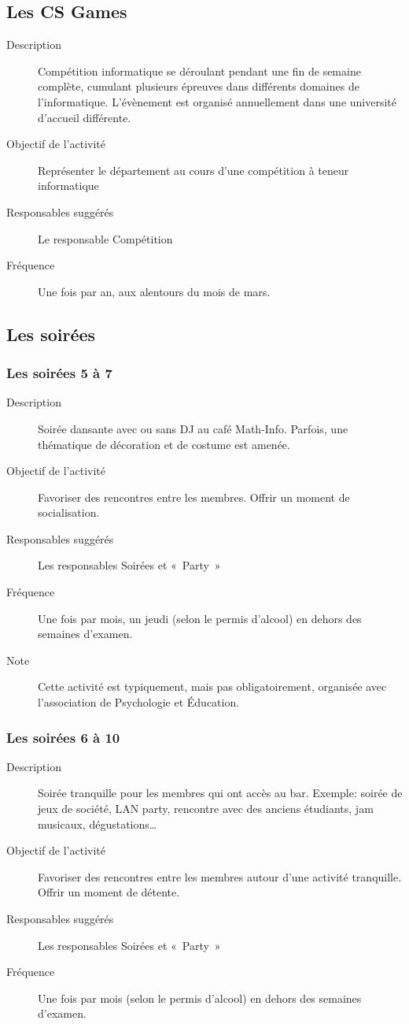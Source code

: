 \documentclass{aediroum}
\begin{document}
\subsection{Les CS Games}
\begin{description}
	\item[Description] Compétition informatique se déroulant pendant une fin de semaine complète, cumulant plusieurs épreuves dans différents domaines de l'informatique. L'évènement est organisé annuellement dans une université d'accueil différente.
	\item[Objectif de l'activité] Représenter le département au cours d'une compétition à teneur informatique
	\item[Responsables suggérés] Le responsable Compétition
	\item[Fréquence] Une fois par an, aux alentours du mois de mars.
\end{description}

\subsection{Les soirées}
\subsubsection{Les soirées 5 à 7}
\begin{description}
	\item[Description] Soirée dansante avec ou sans DJ au café Math-Info. Parfois, une thématique de décoration et de costume est amenée.
	\item[Objectif de l'activité] Favoriser des rencontres entre les membres. Offrir un moment de socialisation.
	\item[Responsables suggérés] Les responsables Soirées et «~Party~»
	\item[Fréquence] Une fois par mois, un jeudi (selon le permis d'alcool) en dehors des semaines d'examen.
	\item[Note] Cette activité est typiquement, mais pas obligatoirement, organisée avec l'association de Psychologie et Éducation.
\end{description}

\subsubsection{Les soirées 6 à 10}
\begin{description}
	\item[Description] Soirée tranquille pour les membres qui ont accès au bar. Exemple: soirée de jeux de société, LAN party, rencontre avec des anciens étudiants, jam musicaux, dégustations\ldots{}
	\item[Objectif de l'activité] Favoriser des rencontres entre les membres autour d'une activité tranquille. Offrir un moment de détente.
	\item[Responsables suggérés] Les responsables Soirées et «~Party~»
	\item[Fréquence] Une fois par mois (selon le permis d'alcool) en dehors des semaines d'examen.
\end{description}
\end{document}
